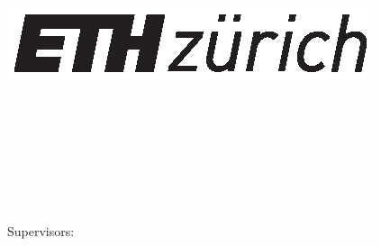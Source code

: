 
\begin{titlepage}

\includegraphics{gfx/eth_logo_kurz_pos.eps}


\begin{addmargin}[-1cm]{-3cm}
\begin{center}
\large

\hfill
\vfill

\begingroup
\spacedallcaps{\myTitle} \\ \bigskip %
\endgroup

\spacedlowsmallcaps{\myName} %

\vfill


\myDegree \\
\myDepartment \\
\myUni \\ \bigskip

\myTime\ \\ \bigskip%

{\footnotesize Supervisors:}\\
\myProf \\
\mySupervisorOne \\
\mySupervisorTwo


\vfill

\end{center}
\end{addmargin}


\end{titlepage}